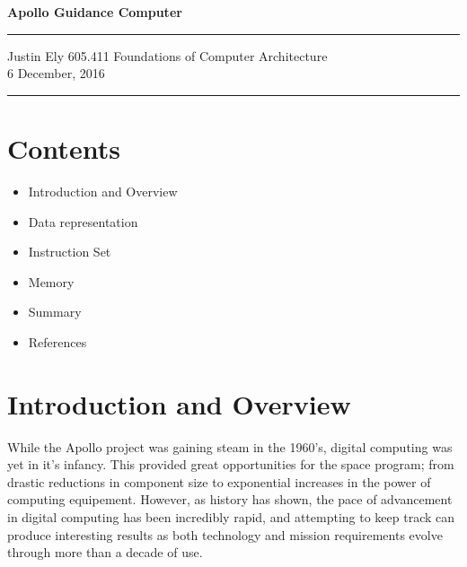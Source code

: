 \documentclass[a4paper,11pt]{article}
\begin{document}
\begin{flushright}

\vspace{1.1cm}

{\bf\Huge Apollo Guidance Computer}

\rule{0.25\linewidth}{0.5pt}


\vspace{0.5cm}
Justin Ely
\linebreak
\newline
\footnotesize{605.411 Foundations of Computer Architecture \\}
\vspace{0.1cm}
6 December, 2016
\end{flushright}

\noindent\rule{\linewidth}{1.0pt}



\section{Contents}
\begin{itemize}
\item Introduction and Overview %
\item Data representation
\item Instruction Set
\item Memory
\item Summary
\item References
\end{itemize}


\section{Introduction and Overview}

While the Apollo project was gaining steam in the 1960's, digital computing was yet in it's infancy.  This provided great opportunities for the space program; from drastic reductions in component size to exponential increases in the power of computing equipement.  However, as history has shown, the pace of advancement in digital computing has been incredibly rapid, and attempting to keep track can produce interesting results as both technology and mission requirements evolve through more than a decade of use.  
\end{document}
